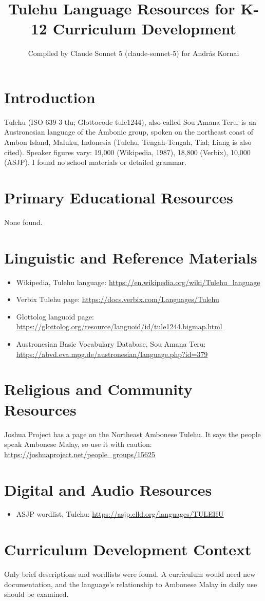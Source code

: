 \documentclass[12pt]{article}
\title{Tulehu Language Resources for K-12 Curriculum Development}
\author{Compiled by Claude Sonnet 5 (claude-sonnet-5) for Andr\'as Kornai}
\date{}
\begin{document}
\maketitle

\section{Introduction}
Tulehu (ISO 639-3 tlu; Glottocode tule1244), also called Sou Amana Teru, is an Austronesian language of the Ambonic group, spoken on the northeast coast of Ambon Island, Maluku, Indonesia (Tulehu, Tengah-Tengah, Tial; Liang is also cited). Speaker figures vary: 19,000 (Wikipedia, 1987), 18,800 (Verbix), 10,000 (ASJP). I found no school materials or detailed grammar.

\section{Primary Educational Resources}
None found.

\section{Linguistic and Reference Materials}
\begin{itemize}
\item Wikipedia, Tulehu language: \url{https://en.wikipedia.org/wiki/Tulehu_language}
\item Verbix Tulehu page: \url{https://docs.verbix.com/Languages/Tulehu}
\item Glottolog languoid page: \url{https://glottolog.org/resource/languoid/id/tule1244.bigmap.html}
\item Austronesian Basic Vocabulary Database, Sou Amana Teru: \url{https://abvd.eva.mpg.de/austronesian/language.php?id=379}
\end{itemize}

\section{Religious and Community Resources}
Joshua Project has a page on the Northeast Ambonese Tulehu. It says the people speak Ambonese Malay, so use it with caution: \url{https://joshuaproject.net/people_groups/15625}

\section{Digital and Audio Resources}
\begin{itemize}
\item ASJP wordlist, Tulehu: \url{https://asjp.clld.org/languages/TULEHU}
\end{itemize}

\section{Curriculum Development Context}
Only brief descriptions and wordlists were found. A curriculum would need new documentation, and the language's relationship to Ambonese Malay in daily use should be examined.
\end{document}
